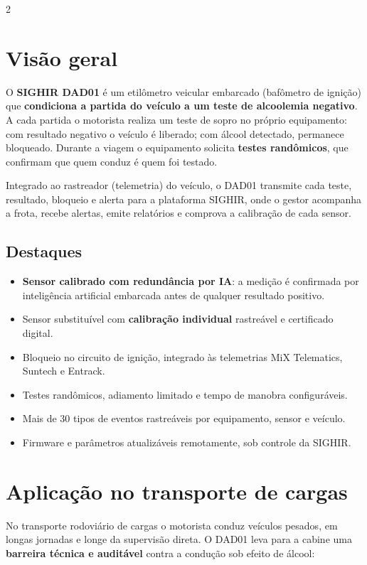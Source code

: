 \documentclass[a4paper,10pt]{article}
\newcommand{\hl}[1]{\textbf{\color{sgreendark}#1}}
\begin{document}
\begin{multicols}{2}
\section{Visão geral}

O \textbf{SIGHIR DAD01} é um etilômetro veicular embarcado (bafômetro de ignição) que
\hl{condiciona a partida do veículo a um teste de alcoolemia negativo}. A cada partida o
motorista realiza um teste de sopro no próprio equipamento: com resultado negativo o veículo é
liberado; com álcool detectado, permanece bloqueado. Durante a viagem o equipamento solicita
\hl{testes randômicos}, que confirmam que quem conduz é quem foi testado.

Integrado ao rastreador (telemetria) do veículo, o DAD01 transmite cada teste, resultado,
bloqueio e alerta para a plataforma SIGHIR, onde o gestor acompanha a frota, recebe alertas,
emite relatórios e comprova a calibração de cada sensor.

\subsection*{Destaques}
\begin{itemize}
  \item \textbf{Sensor calibrado com redundância por IA}: a medição é confirmada por inteligência artificial embarcada antes de qualquer resultado positivo.
  \item Sensor substituível com \textbf{calibração individual} rastreável e certificado digital.
  \item Bloqueio no circuito de ignição, integrado às telemetrias MiX Telematics, Suntech e Entrack.
  \item Testes randômicos, adiamento limitado e tempo de manobra configuráveis.
  \item Mais de 30 tipos de eventos rastreáveis por equipamento, sensor e veículo.
  \item Firmware e parâmetros atualizáveis remotamente, sob controle da SIGHIR.
\end{itemize}

\columnbreak
\section{Aplicação no transporte de cargas}

No transporte rodoviário de cargas o motorista conduz veículos pesados, em longas jornadas e
longe da supervisão direta. O DAD01 leva para a cabine uma \textbf{barreira técnica e
auditável} contra a condução sob efeito de álcool:


\end{multicols}
\end{document}
